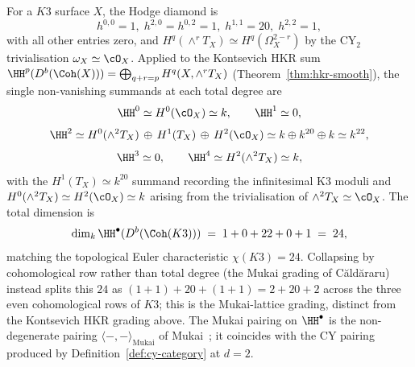 \begin{example}
\label{ex:hh-k3}
For a $K3$ surface $X$, the Hodge diamond is
\[
 h^{0,0} = 1,\; h^{2,0} = h^{0,2} = 1,\; h^{1,1} = 20,\; h^{2,2} = 1,
\]
with all other entries zero, and $H^q(\wedge^r T_X) \simeq H^q(\Omega_X^{2-r})$ by the CY$_2$ trivialisation $\omega_X \simeq \cO_X$. Applied to the Kontsevich HKR sum
$\HH^p(D^b(\Coh(X))) = \bigoplus_{q + r = p} H^q(X, \wedge^r T_X)$ (Theorem~\ref{thm:hkr-smooth}), the single non-vanishing summands at each total degree are
\[
 \HH^0 \simeq H^0(\cO_X) \simeq k, \qquad
 \HH^1 \simeq 0,
\]
\[
 \HH^2 \simeq H^0(\wedge^2 T_X) \,\oplus\, H^1(T_X) \,\oplus\, H^2(\cO_X) \simeq k \oplus k^{20} \oplus k \simeq k^{22},
\]
\[
 \HH^3 \simeq 0, \qquad
 \HH^4 \simeq H^2(\wedge^2 T_X) \simeq k,
\]
with the $H^1(T_X) \simeq k^{20}$ summand recording the infinitesimal K3 moduli and $H^0(\wedge^2 T_X) \simeq H^2(\cO_X) \simeq k$ arising from the trivialisation of $\wedge^2 T_X \simeq \cO_X$. The total dimension is
\[
 \dim_k \HH^\bullet(D^b(\Coh(K3))) \;=\; 1 + 0 + 22 + 0 + 1 \;=\; 24,
\]
matching the topological Euler characteristic $\chi(K3) = 24$. Collapsing by cohomological row rather than total degree (the Mukai grading of C{\u a}ld{\u a}raru) instead splits this $24$ as $(1{+}1) + 20 + (1{+}1) = 2 + 20 + 2$ across the three even cohomological rows of $K3$; this is the Mukai-lattice grading, distinct from the Kontsevich HKR grading above. The Mukai pairing on $\HH^\bullet$ is the non-degenerate pairing $\langle -, - \rangle_\mathrm{Mukai}$ of Mukai~\cite{Mukai1987}; it coincides with the CY pairing produced by Definition~\ref{def:cy-category} at $d = 2$.
\end{example}

